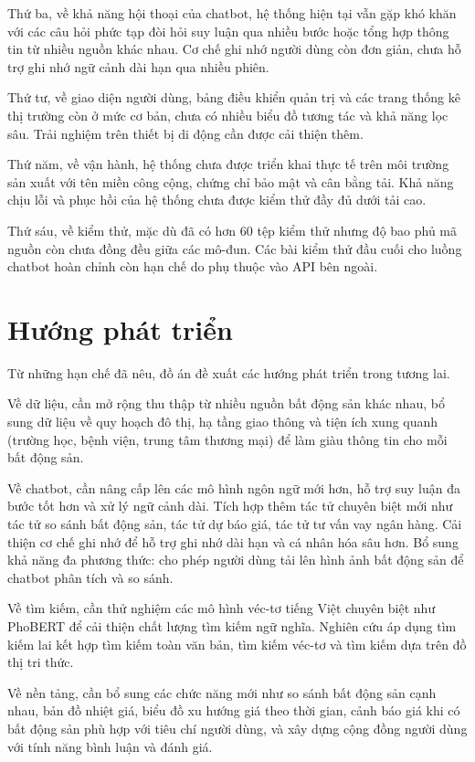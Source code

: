 Thứ ba, về khả năng hội thoại của chatbot, hệ thống hiện tại vẫn gặp khó khăn với các câu hỏi phức tạp đòi hỏi suy luận qua nhiều bước hoặc tổng hợp thông tin từ nhiều nguồn khác nhau. Cơ chế ghi nhớ người dùng còn đơn giản, chưa hỗ trợ ghi nhớ ngữ cảnh dài hạn qua nhiều phiên.

Thứ tư, về giao diện người dùng, bảng điều khiển quản trị và các trang thống kê thị trường còn ở mức cơ bản, chưa có nhiều biểu đồ tương tác và khả năng lọc sâu. Trải nghiệm trên thiết bị di động cần được cải thiện thêm.

Thứ năm, về vận hành, hệ thống chưa được triển khai thực tế trên môi trường sản xuất với tên miền công cộng, chứng chỉ bảo mật và cân bằng tải. Khả năng chịu lỗi và phục hồi của hệ thống chưa được kiểm thử đầy đủ dưới tải cao.

Thứ sáu, về kiểm thử, mặc dù đã có hơn 60 tệp kiểm thử nhưng độ bao phủ mã nguồn còn chưa đồng đều giữa các mô-đun. Các bài kiểm thử đầu cuối cho luồng chatbot hoàn chỉnh còn hạn chế do phụ thuộc vào API bên ngoài.

\section*{Hướng phát triển}

Từ những hạn chế đã nêu, đồ án đề xuất các hướng phát triển trong tương lai.

Về dữ liệu, cần mở rộng thu thập từ nhiều nguồn bất động sản khác nhau, bổ sung dữ liệu về quy hoạch đô thị, hạ tầng giao thông và tiện ích xung quanh (trường học, bệnh viện, trung tâm thương mại) để làm giàu thông tin cho mỗi bất động sản.

Về chatbot, cần nâng cấp lên các mô hình ngôn ngữ mới hơn, hỗ trợ suy luận đa bước tốt hơn và xử lý ngữ cảnh dài. Tích hợp thêm tác tử chuyên biệt mới như tác tử so sánh bất động sản, tác tử dự báo giá, tác tử tư vấn vay ngân hàng. Cải thiện cơ chế ghi nhớ để hỗ trợ ghi nhớ dài hạn và cá nhân hóa sâu hơn. Bổ sung khả năng đa phương thức: cho phép người dùng tải lên hình ảnh bất động sản để chatbot phân tích và so sánh.

Về tìm kiếm, cần thử nghiệm các mô hình véc-tơ tiếng Việt chuyên biệt như PhoBERT để cải thiện chất lượng tìm kiếm ngữ nghĩa. Nghiên cứu áp dụng tìm kiếm lai kết hợp tìm kiếm toàn văn bản, tìm kiếm véc-tơ và tìm kiếm dựa trên đồ thị tri thức.

Về nền tảng, cần bổ sung các chức năng mới như so sánh bất động sản cạnh nhau, bản đồ nhiệt giá, biểu đồ xu hướng giá theo thời gian, cảnh báo giá khi có bất động sản phù hợp với tiêu chí người dùng, và xây dựng cộng đồng người dùng với tính năng bình luận và đánh giá.

